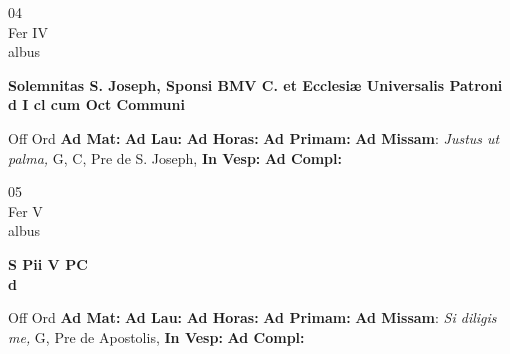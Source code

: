 \documentclass[10pt, openany]{book}
\begin{document}
    \begin{center}
        \begin{minipage}{3.5in}
            \vspace{2em}
            \begin{minipage}{0.5in}
                {\Huge 04} \\
                {\normalsize Fer IV} \\
                {\normalsize albus}
            \end{minipage}
            \begin{minipage}{3.0in}
                \textbf{ \large Solemnitas S. Joseph, Sponsi BMV C. et Ecclesiæ Universalis Patroni \\
                \textnormal{\normalsize d I cl cum Oct Communi}} \\ 
            \end{minipage}
            \begin{justify}Off Ord
                \textbf{Ad Mat: }
                \textbf{Ad Lau: }
                \textbf{Ad Horas: }
                \textbf{Ad Primam: }\textbf{Ad Missam}: \textit{Justus ut palma,} G, C, Pre de S. Joseph,  
                \textbf{In Vesp: }
                \textbf{Ad Compl: }
            \end{justify}
        \end{minipage}
    \end{center}

    \begin{center}
        \begin{minipage}{3.5in}
            \vspace{2em}
            \begin{minipage}{0.5in}
                {\Huge 05} \\
                {\normalsize Fer V} \\
                {\normalsize albus}
            \end{minipage}
            \begin{minipage}{3.0in}
                \textbf{ \large S Pii V PC \\
                \textnormal{\normalsize d}} \\ 
            \end{minipage}
            \begin{justify}Off Ord
                \textbf{Ad Mat: }
                \textbf{Ad Lau: }
                \textbf{Ad Horas: }
                \textbf{Ad Primam: }\textbf{Ad Missam}: \textit{Si diligis me,} G, Pre de Apostolis,  
                \textbf{In Vesp: }
                \textbf{Ad Compl: }
            \end{justify}
        \end{minipage}
    \end{center}
\end{document}
